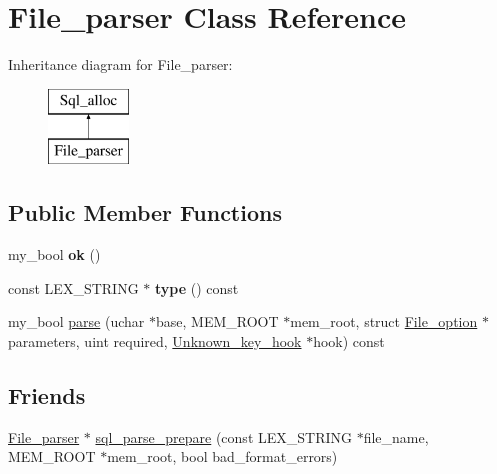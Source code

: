 \hypertarget{classFile__parser}{}\section{File\+\_\+parser Class Reference}
\label{classFile__parser}
Inheritance diagram for File\+\_\+parser\+:\begin{figure}[H]
\begin{center}
\leavevmode
\includegraphics[height=2.000000cm]{classFile__parser}
\end{center}
\end{figure}
\subsection*{Public Member Functions}
\begin{DoxyCompactItemize}
\item 
\mbox{\label{classFile__parser_a289741d32f46f48e4d17283792e8fadc}} 
my\+\_\+bool {\bfseries ok} ()
\item 
\mbox{\label{classFile__parser_a2438a46c812d466e9f2baa57d5f85a81}} 
const L\+E\+X\+\_\+\+S\+T\+R\+I\+NG $\ast$ {\bfseries type} () const
\item 
my\+\_\+bool \mbox{\hyperlink{classFile__parser_a8b56162c3cbb58958dfca3853e8fd736}{parse}} (uchar $\ast$base, M\+E\+M\+\_\+\+R\+O\+OT $\ast$mem\+\_\+root, struct \mbox{\hyperlink{structFile__option}{File\+\_\+option}} $\ast$parameters, uint required, \mbox{\hyperlink{classUnknown__key__hook}{Unknown\+\_\+key\+\_\+hook}} $\ast$hook) const
\end{DoxyCompactItemize}
\subsection*{Friends}
\begin{DoxyCompactItemize}
\item 
\mbox{\hyperlink{classFile__parser}{File\+\_\+parser}} $\ast$ \mbox{\hyperlink{classFile__parser_af0a1c80e1f5fd497fb530ded638bcdf3}{sql\+\_\+parse\+\_\+prepare}} (const L\+E\+X\+\_\+\+S\+T\+R\+I\+NG $\ast$file\+\_\+name, M\+E\+M\+\_\+\+R\+O\+OT $\ast$mem\+\_\+root, bool bad\+\_\+format\+\_\+errors)
\end{DoxyCompactItemize}
